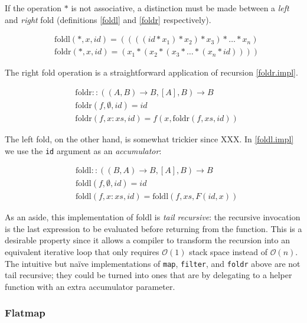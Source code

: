 If the operation $\ast$ is not associative, a distinction must be made between a \emph{left} and \emph{right} fold (definitions \ref{foldl} and \ref{foldr} respectively).

\begin{align}
& \text{foldl}(\ast, x, id) = ((((id \ast x_1) \ast x_2) \ast x_3) \ast \dots \ast x_n) \label{foldl} \\
& \text{foldr}(\ast, x, id) = (x_1 \ast (x_2 \ast (x_3 \ast \dots \ast (x_n \ast id)))) \label{foldr}
\end{align}

The right fold operation is a straightforward application of recursion \eqref{foldr.impl}.

\begin{equation}
\begin{split}
& \text{foldr} :: ((A, B) \to B, [A], B) \to B \label{foldr.impl} \\
& \text{foldr}(f, \emptyset, id) = id \\
& \text{foldr}(f, x:xs, id) = f(x, \text{foldr}(f, xs, id))
\end{split}
\end{equation}

The left fold, on the other hand, is somewhat trickier since XXX. In \eqref{foldl.impl} we use the \texttt{id} argument as an \emph{accumulator}:

\begin{equation}
\begin{split}
& \text{foldl} :: ((B, A) \to B, [A], B) \to B \label{foldl.impl} \\
& \text{foldl}(f, \emptyset, id) = id \\
& \text{foldl}(f, x:xs, id) = \text{foldl}(f, xs, F(id, x))
\end{split}
\end{equation}

As an aside, this implementation of foldl is \emph{tail recursive}: the recursive invocation is the last expression to be evaluated before returning from the function. This is a desirable property since it allows a compiler to transform the recursion into an equivalent iterative loop that only requires $\mathcal{O}(1)$ stack space instead of $\mathcal{O}(n)$. The intuitive but naïve implementations of \texttt{map}, \texttt{filter}, and \texttt{foldr} above are not tail recursive; they could be turned into ones that are by delegating to a helper function with an extra accumulator parameter.

\subsubsection{Flatmap}

